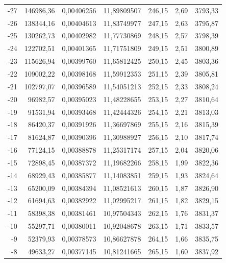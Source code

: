 \documentclass[12pt,a4paper,final,twoside,fleqn]{article}
\begin{document}
\begin{ThreePartTable}
\begin{longtable}{rrrrrrr}
-27          & 146986,36 & 0,00406256    & 11,89809507 & 246,15     & 2,69       & 3793,33 \\
-26          & 138344,16 & 0,00404613    & 11,83749977 & 247,15     & 2,63       & 3795,87 \\
-25          & 130262,73 & 0,00402982    & 11,77730869 & 248,15     & 2,57       & 3798,39 \\
-24          & 122702,51 & 0,00401365    & 11,71751809 & 249,15     & 2,51       & 3800,89 \\
-23          & 115626,94 & 0,00399760    & 11,65812425 & 250,15     & 2,45       & 3803,36 \\
-22          & 109002,22 & 0,00398168    & 11,59912353 & 251,15     & 2,39       & 3805,81 \\
-21          & 102797,07 & 0,00396589    & 11,54051213 & 252,15     & 2,33       & 3808,24 \\
-20          & 96982,57  & 0,00395023    & 11,48228655 & 253,15     & 2,27       & 3810,64 \\
-19          & 91531,94  & 0,00393468    & 11,42444326 & 254,15     & 2,21       & 3813,03 \\
-18          & 86420,37  & 0,00391926    & 11,36697869 & 255,15     & 2,16       & 3815,39 \\
-17          & 81624,87  & 0,00390396    & 11,30988927 & 256,15     & 2,10       & 3817,74 \\
-16          & 77124,15  & 0,00388878    & 11,25317174 & 257,15     & 2,04       & 3820,06 \\
-15          & 72898,45  & 0,00387372    & 11,19682266 & 258,15     & 1,99       & 3822,36 \\
-14          & 68929,43  & 0,00385877    & 11,14083851 & 259,15     & 1,93       & 3824,64 \\
-13          & 65200,09  & 0,00384394    & 11,08521613 & 260,15     & 1,87       & 3826,90 \\
-12          & 61694,63  & 0,00382922    & 11,02995217 & 261,15     & 1,82       & 3829,15 \\
-11          & 58398,38  & 0,00381461    & 10,97504343 & 262,15     & 1,76       & 3831,37 \\
-10          & 55297,71  & 0,00380011    & 10,92048678 & 263,15     & 1,71       & 3833,57 \\
-9           & 52379,93  & 0,00378573    & 10,86627878 & 264,15     & 1,66       & 3835,75 \\
-8           & 49633,27  & 0,00377145    & 10,81241665 & 265,15     & 1,60       & 3837,92 \\

\end{longtable}
\end{ThreePartTable}
\end{document}

